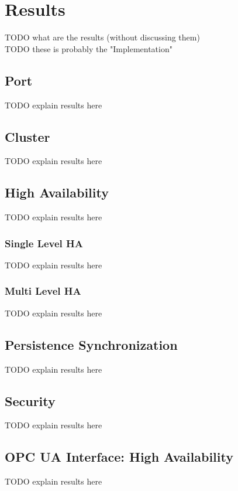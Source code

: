 \chapter{Results}
TODO what are the results (without discussing them)\\
TODO these is probably the "Implementation"\\

\section{Port}\label{sec:res:port}
TODO explain results here\\


\section{Cluster}\label{sec:res:cluster}
TODO explain results here\\


\section{High Availability}\label{sec:res:ha}
TODO explain results here\\

\subsection*{Single Level HA}\label{sec:res:sl-ha}
TODO explain results here\\

\subsection*{Multi Level HA}\label{sec:res:ml-ha}
TODO explain results here\\

\section{Persistence Synchronization}\label{sec:res:psync}
TODO explain results here\\

\section{Security}\label{sec:res:security}
TODO explain results here\\

\section{OPC UA Interface: High Availability}\label{sec:res:opc-ua}
TODO explain results here\\
